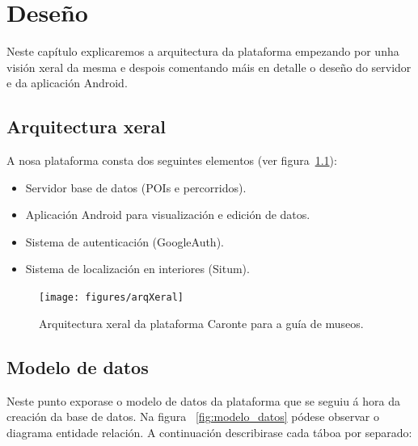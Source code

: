 \chapter{Deseño}

Neste capítulo explicaremos a arquitectura da plataforma empezando por unha visión xeral da mesma e despois comentando máis en detalle o deseño do servidor e da aplicación Android.


\section{Arquitectura xeral}

A nosa plataforma consta dos seguintes elementos (ver figura~\ref{fig:arq_xeral}):
\begin{itemize}
	\item Servidor base de datos (POIs e percorridos).
	\item Aplicación Android para visualización e edición de datos.
	\item Sistema de autenticación (GoogleAuth).
	\item Sistema de localización en interiores (Situm).
\end{itemize}


\begin{figure}[tb] 
	\begin{center}
		\texttt{[image: figures/arqXeral]}
		\caption{Arquitectura xeral da plataforma Caronte para a guía de museos.}
		\label{fig:arq_xeral}
	\end{center}
\end{figure}



\section{Modelo de datos}
Neste punto exporase o modelo de datos da plataforma que se seguiu á hora da creación da base de datos. Na figura ~\ref{fig:modelo_datos} pódese observar o diagrama entidade relación. A continuación describirase cada táboa por separado:

